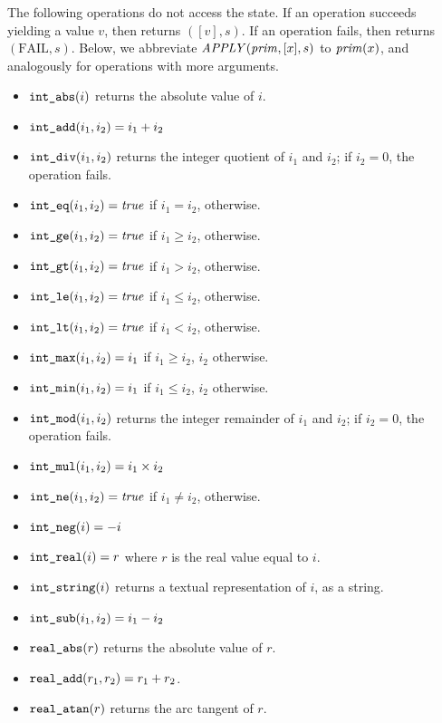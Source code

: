 The following operations do not access the state.
If an operation succeeds yielding a value $v$,
then  returns $([v],s)$.
If an operation fails, then  returns $(\mathrm{FAIL},s)$.
Below, we abbreviate $\mbox{\textit{APPLY}}(\mbox{\textit{prim}},[x],s)$ to $\mbox{\textit{prim}}(x)$,
and analogously for operations with more arguments.
\begin{itemize}
\item $\mbox{\texttt{int\_abs}}(i)$ returns the absolute value of $i$.
\item $\mbox{\texttt{int\_add}}(i_1,i_2) = i_1 + i_2$
\item $\mbox{\texttt{int\_div}}(i_1,i_2)$ returns the integer quotient of $i_1$ and $i_2$;
if $i_2 = 0$, the operation fails.
\item $\mbox{\texttt{int\_eq}}(i_1,i_2) = \mbox{\textit{true}}$ if $i_1 = i_2$,  otherwise.
\item $\mbox{\texttt{int\_ge}}(i_1,i_2) = \mbox{\textit{true}}$ if $i_1 \geq i_2$,  otherwise.
\item $\mbox{\texttt{int\_gt}}(i_1,i_2) = \mbox{\textit{true}}$ if $i_1 > i_2$,  otherwise.
\item $\mbox{\texttt{int\_le}}(i_1,i_2) = \mbox{\textit{true}}$ if $i_1 \leq i_2$,  otherwise.
\item $\mbox{\texttt{int\_lt}}(i_1,i_2) = \mbox{\textit{true}}$ if $i_1 < i_2$,  otherwise.
\item $\mbox{\texttt{int\_max}}(i_1,i_2) = i_1$ if $i_1 \geq i_2$, $i_2$ otherwise.
\item $\mbox{\texttt{int\_min}}(i_1,i_2) = i_1$ if $i_1 \leq i_2$, $i_2$ otherwise.
\item $\mbox{\texttt{int\_mod}}(i_1,i_2)$ returns the integer remainder of $i_1$ and $i_2$;
if $i_2 = 0$, the operation fails.
\item $\mbox{\texttt{int\_mul}}(i_1,i_2) = i_1 \times i_2$
\item $\mbox{\texttt{int\_ne}}(i_1,i_2) = \mbox{\textit{true}}$ if $i_1 \neq i_2$,  otherwise.
\item $\mbox{\texttt{int\_neg}}(i) = -i$
\item $\mbox{\texttt{int\_real}}(i) = r$ where $r$ is the real value equal to $i$.
\item $\mbox{\texttt{int\_string}}(i)$ returns a textual representation of $i$, as a string.
\item $\mbox{\texttt{int\_sub}}(i_1,i_2) = i_1 - i_2$
\item $\mbox{\texttt{real\_abs}}(r)$ returns the absolute value of $r$.
\item $\mbox{\texttt{real\_add}}(r_1,r_2) = r_1 + r_2$.
\item $\mbox{\texttt{real\_atan}}(r)$ returns the arc tangent of $r$.

\end{itemize}
